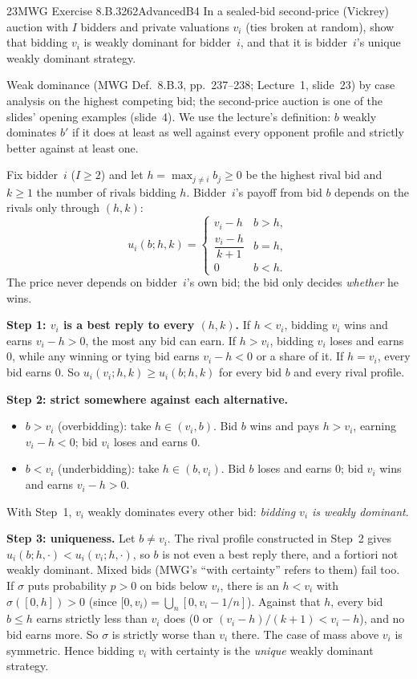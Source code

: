 \begin{exsol}{23}{MWG Exercise 8.B.3}{262}{Advanced}{B4}
\asked In a sealed-bid second-price (Vickrey) auction with $I$ bidders and private valuations
$v_i$ (ties broken at random), show that bidding $v_i$ is weakly dominant for bidder~$i$, and
that it is bidder~$i$'s unique weakly dominant strategy.

\method Weak dominance (MWG Def.~8.B.3, pp.~237--238; Lecture~1, slide~23) by case analysis on
the highest competing bid; the second-price auction is one of the slides' opening examples
(slide~4). We use the lecture's definition: $b$ weakly dominates $b'$ if it does at least as well
against every opponent profile and strictly better against at least one.

\solution
Fix bidder~$i$ ($I \ge 2$) and let $h = \max_{j \ne i} b_j \ge 0$ be the highest rival bid and
$k \ge 1$ the number of rivals bidding $h$. Bidder~$i$'s payoff from bid $b$ depends on the rivals
only through $(h, k)$:
\[
  u_i(b; h, k) = \begin{cases} v_i - h & b > h,\\ \dfrac{v_i - h}{k + 1} & b = h,\\ 0 & b < h. \end{cases}
\]
The price never depends on bidder~$i$'s own bid; the bid only decides \emph{whether} he wins.

\textbf{Step 1: $v_i$ is a best reply to every $(h, k)$.} If $h < v_i$, bidding $v_i$ wins and
earns $v_i - h > 0$, the most any bid can earn. If $h > v_i$, bidding $v_i$ loses and earns $0$,
while any winning or tying bid earns $v_i - h < 0$ or a share of it. If $h = v_i$, every bid earns
$0$. So $u_i(v_i; h, k) \ge u_i(b; h, k)$ for every bid $b$ and every rival profile.

\textbf{Step 2: strict somewhere against each alternative.}
\begin{itemize}
  \item $b > v_i$ (overbidding): take $h \in (v_i, b)$. Bid $b$ wins and pays $h > v_i$, earning
  $v_i - h < 0$; bid $v_i$ loses and earns $0$.
  \item $b < v_i$ (underbidding): take $h \in (b, v_i)$. Bid $b$ loses and earns $0$; bid $v_i$
  wins and earns $v_i - h > 0$.
\end{itemize}
With Step~1, $v_i$ weakly dominates every other bid: \emph{bidding $v_i$ is weakly dominant}.

\textbf{Step 3: uniqueness.} Let $b \ne v_i$. The rival profile constructed in Step~2 gives
$u_i(b; h, \cdot) < u_i(v_i; h, \cdot)$, so $b$ is not even a best reply there, and a fortiori
not weakly dominant. Mixed bids (MWG's ``with certainty'' refers to them) fail too. If $\sigma$
puts probability $p > 0$ on bids below $v_i$, there is an $h < v_i$ with
$\sigma([0, h]) > 0$ (since $[0, v_i) = \bigcup_n [0, v_i - 1/n]$). Against that $h$, every bid
$b \le h$ earns strictly less than $v_i$ does ($0$ or $(v_i - h)/(k+1) < v_i - h$), and no bid
earns more. So $\sigma$ is strictly worse than $v_i$ there. The case of mass above $v_i$ is
symmetric. Hence bidding $v_i$ with certainty is the \emph{unique} weakly dominant strategy.


\end{exsol}
